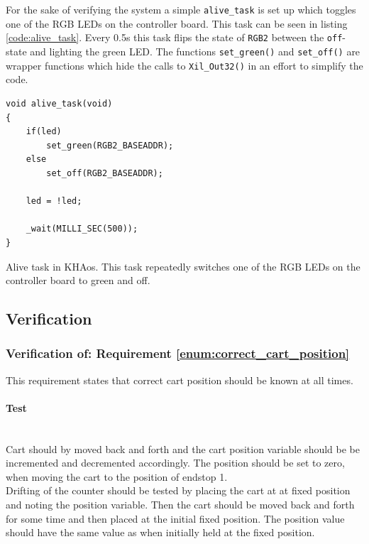 \\~\\
For the sake of verifying the system a simple \texttt{alive\_task} is set up which toggles one of the RGB LEDs on the controller board.
This task can be seen in listing \ref{code:alive_task}.
Every 0.5s this task flips the state of \texttt{RGB2} between the \texttt{off}-state and lighting the green LED.
The functions \texttt{set\_green()} and \texttt{set\_off()} are wrapper functions which hide the calls to \texttt{Xil\_Out32()} in an effort to simplify the code.
\begin{listing}[H]
\begin{verbatim}
void alive_task(void)
{
	if(led)
		set_green(RGB2_BASEADDR);
	else
		set_off(RGB2_BASEADDR);

	led = !led;

	_wait(MILLI_SEC(500));
}
\end{verbatim}
\caption[Alive task in KHAos.]{Alive task in KHAos. This task repeatedly switches one of the RGB LEDs on the controller board to green and off.}
\label{code:alive_task}
\end{listing}

\subsection{Verification} %
\label{sub:verification}

\subsubsection{Verification of: Requirement \ref{enum:correct_cart_position}} %
\label{ssub:verification_of_requirement_}
This requirement states that correct cart position should be known at all times.

\paragraph{Test}~\\
Cart should by moved back and forth and the cart position variable should be be incremented and decremented accordingly.
The position should be set to zero, when moving the cart to the position of endstop 1.
\\
Drifting of the counter should be tested by placing the cart at at fixed position and noting the position variable.
Then the cart should be moved back and forth for some time and then placed at the initial fixed position. 
The position value should have the same value as when initially held at the fixed position.

